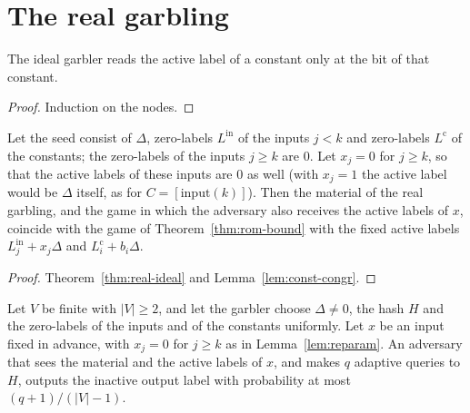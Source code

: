 \section{The real garbling}

\begin{lemma}
  \label{lem:const-congr}
  \leanok
  The ideal garbler reads the active label of a constant only at the bit of that constant.
\end{lemma}

\begin{proof}
  \leanok
  Induction on the nodes.
\end{proof}

\begin{lemma}[Reparametrization]
  \label{lem:reparam}
  \leanok
  Let the seed consist of $\Delta$, zero-labels $L^{\mathrm{in}}$ of the inputs $j < k$ and
  zero-labels $L^{\mathrm{c}}$ of the constants; the zero-labels of the inputs $j \geq k$ are $0$.
  Let $x_j = 0$ for $j \geq k$, so that the active labels of these inputs are $0$ as well (with
  $x_j = 1$ the active label would be $\Delta$ itself, as for $C = [\mathrm{input}(k)]$). Then the
  material of the real garbling, and the game in which the adversary also receives the active
  labels of $x$, coincide with the game of Theorem~\ref{thm:rom-bound} with the fixed active labels
  $L^{\mathrm{in}}_j + x_j\Delta$ and $L^{\mathrm{c}}_i + b_i \Delta$.
\end{lemma}

\begin{proof}
  \leanok
  Theorem~\ref{thm:real-ideal} and Lemma~\ref{lem:const-congr}.
\end{proof}

\begin{theorem}
  \label{thm:garble-rom}
  \leanok
  Let $V$ be finite with $|V| \geq 2$, and let the garbler choose $\Delta \neq 0$, the hash $H$ and the zero-labels
  of the inputs and of the constants uniformly. Let $x$ be an input fixed in advance, with
  $x_j = 0$ for $j \geq k$ as in Lemma~\ref{lem:reparam}. An adversary that sees the material and
  the active labels of $x$, and makes $q$ adaptive queries to $H$, outputs the inactive output label
  with probability at most $(q + 1)/(|V| - 1)$.
\end{theorem}

